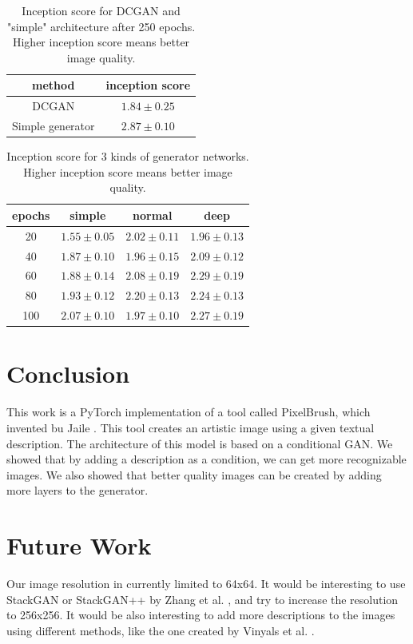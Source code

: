 \documentclass[a4paper]{article}
\begin{document}
\begin{table}[!ht]
    \centering
    \begin{tabular}{c|c}
        method & inception score\\
        \hline
        DCGAN & $1.84 \pm  0.25$ \\
        Simple generator & $2.87 \pm 0.10$
    \end{tabular}
    \caption{Inception score for DCGAN and "simple" architecture after 250 epochs. Higher inception score means better image quality.}
    \label{tab:inception_DCGAN}
\end{table}

\begin{table}[!ht]
    \centering
    \begin{tabular}{c|c|c|c}
        epochs & simple & normal & deep\\
        \hline
        20 & $1.55 \pm  0.05$ & $\boldsymbol{2.02 \pm  0.11}$ & $1.96 \pm  0.13$ \\
        40 & $1.87 \pm 0.10$ & $1.96 \pm 0.15$ & $\boldsymbol{2.09 \pm 0.12}$ \\
        60 & $1.88 \pm 0.14$ & $2.08 \pm 0.19$ & $\boldsymbol{2.29 \pm 0.19}$ \\
        80 & $1.93 \pm 0.12$ & $2.20 \pm 0.13$ & $\boldsymbol{2.24 \pm 0.13}$ \\
        100 & $2.07 \pm 0.10$ & $1.97 \pm 0.10$ & $\boldsymbol{2.27 \pm 0.19}$
    \end{tabular}
    \caption{Inception score for 3 kinds of generator networks. Higher inception score means better image quality.}
    \label{tab:inception_generators}
\end{table}

\section{Conclusion}
This work is a PyTorch implementation of a tool called PixelBrush, which invented bu Jaile \cite{Zhi2017PixelBrush}. This tool creates an artistic image using a given textual description. The architecture of this model is based on a conditional GAN. We showed that by adding a description as a condition, we can get more recognizable images. We also showed that better quality images can be created by adding more layers to the generator.

\section{Future Work}
Our image resolution in currently limited to 64x64. It would be interesting to use StackGAN or StackGAN++ by Zhang et al. \cite{zhang2017stackgan,zhang2017stackgan++}, and try to increase the resolution to 256x256. It would be also interesting to add more descriptions to the images using different methods, like the one created by Vinyals et al. \cite{vinyals2017show}.

\printbibliography
\end{document}
